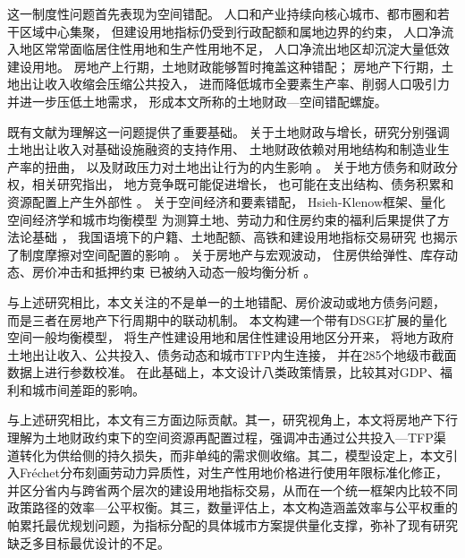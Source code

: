\documentclass[UTF8,a4paper,12pt]{ctexart}
\theoremstyle{plain}
\theoremstyle{definition}
\theoremstyle{remark}
\begin{document}
这一制度性问题首先表现为空间错配。
人口和产业持续向核心城市、都市圈和若干区域中心集聚，
但建设用地指标仍受到行政配额和属地边界的约束，
人口净流入地区常常面临居住性用地和生产性用地不足，
人口净流出地区却沉淀大量低效建设用地。
房地产上行期，土地财政能够暂时掩盖这种错配；
房地产下行期，土地出让收入收缩会压缩公共投入，
进而降低城市全要素生产率、削弱人口吸引力并进一步压低土地需求，
形成本文所称的土地财政—空间错配螺旋。

既有文献为理解这一问题提供了重要基础。
关于土地财政与增长，研究分别强调土地出让收入对基础设施融资的支持作用、
土地财政依赖对用地结构和制造业生产率的扭曲，
以及财政压力对土地出让行为的内生影响
\citep{chen2016,liu2021,zhao2015,fan2019,liu2018}。
关于地方债务和财政分权，相关研究指出，
地方竞争既可能促进增长，
也可能在支出结构、债务积累和资源配置上产生外部性
\citep{bai2016,luo2022,fuyong2007,qiantingyi1994,tiebout1956,oates1972,musgrave1959}。
关于空间经济和要素错配，
Hsieh-Klenow框架、量化空间经济学和城市均衡模型
为测算土地、劳动力和住房约束的福利后果提供了方法论基础
\citep{hsiehklenow2009,eaton2002,ahlfeldt2015,redding2017,fajgelbaum2019,
henderson1974,rosen1979,roback1982,hsiehmoretti2019,diamond2016}，
我国语境下的户籍、土地配额、高铁和建设用地指标交易研究
也揭示了制度摩擦对空间配置的影响
\citep{wang2020,lu2019,yan2021,kline2014,chen2020,lu2020}。
关于房地产与宏观波动，
住房供给弹性、库存动态、房价冲击和抵押约束
已被纳入动态一般均衡分析
\citep{glaeser2005,gyourko2013,favilukis2017,chen2017,huang2018,
kiyotakimoore1997,iacoviello2005,liuetal2013,chen2016b}。

与上述研究相比，本文关注的不是单一的土地错配、房价波动或地方债务问题，
而是三者在房地产下行周期中的联动机制。
本文构建一个带有DSGE扩展的量化空间一般均衡模型，
将生产性建设用地和居住性建设用地区分开来，
将地方政府土地出让收入、公共投入、债务动态和城市TFP内生连接，
并在285个地级市截面数据上进行参数校准。
在此基础上，本文设计八类政策情景，比较其对GDP、福利和城市间差距的影响。

与上述研究相比，本文有三方面边际贡献。其一，研究视角上，本文将房地产下行理解为土地财政约束下的空间资源再配置过程，强调冲击通过公共投入—TFP渠道转化为供给侧的持久损失，而非单纯的需求侧收缩。其二，模型设定上，本文引入Fréchet分布刻画劳动力异质性，对生产性用地价格进行使用年限标准化修正，并区分省内与跨省两个层次的建设用地指标交易，从而在一个统一框架内比较不同政策路径的效率—公平权衡。其三，数量评估上，本文构造涵盖效率与公平权重的帕累托最优规划问题，为指标分配的具体城市方案提供量化支撑，弥补了现有研究缺乏多目标最优设计的不足。

\end{document}

